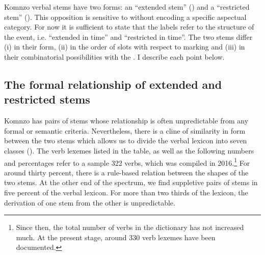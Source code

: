 Komnzo verbal stems have two forms: an ``extended stem'' (\Ext) and a ``restricted stem'' (\Rs). This opposition is sensitive to  without encoding a specific aspectual category. For now it is sufficient to state that the labels refer to the  structure of the event, i.e. ``extended in time'' and ``restricted in time''. The two stems differ (i) in their form, (ii) in the order of slots with respect to  marking and (iii) in their combinatorial possibilities with the . I describe each point below.

\subsection{The formal relationship of extended and restricted stems} \label{formalrelationshipextrs}

Komnzo has pairs of  stems whose relationship is often unpredictable from any formal or semantic criteria. Nevertheless, there is a cline of similarity in form between the two stems which allows us to divide the verbal lexicon into seven classes (). The verb lexemes listed in the table, as well as the following numbers and percentages refer to a sample 322 verbs, which was compiled in 2016.\footnote{Since then, the total number of verbs in the dictionary has not increased much. At the present stage, around 330 verb lexemes have been documented.} For around thirty percent, there is a rule-based relation between the shapes of the two stems. At the other end of the spectrum, we find suppletive pairs of stems in five percent of the verbal lexicon. For more than two thirds of the lexicon, the derivation of one stem from the other is unpredictable.

